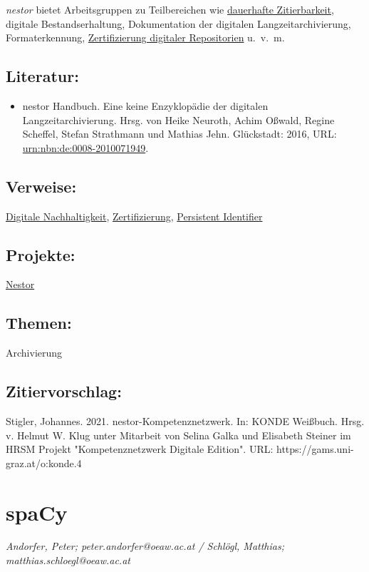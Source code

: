 \documentclass{article}
\begin{document}
        \emph{nestor} bietet Arbeitsgruppen zu Teilbereichen wie \href{http://gams.uni-graz.at/o:konde.12}{dauerhafte Zitierbarkeit}, digitale Bestandserhaltung, Dokumentation der digitalen Langzeitarchivierung, Formaterkennung, \href{http://gams.uni-graz.at/o:konde.13}{Zertifizierung digitaler Repositorien} u. v. m.\\
            
        \subsection*{Literatur:}\begin{itemize}\item nestor Handbuch. Eine keine Enzyklopädie der digitalen Langzeitarchivierung. Hrsg. von Heike Neuroth, Achim Oßwald, Regine Scheffel, Stefan Strathmann und Mathias Jehn. Glückstadt: 2016, URL: \url{urn:nbn:de:0008-2010071949}.\end{itemize}\subsection*{Verweise:}\href{https://gams.uni-graz.at/o:konde.6}{Digitale Nachhaltigkeit}, \href{https://gams.uni-graz.at/o:konde.13}{Zertifizierung}, \href{https://gams.uni-graz.at/o:konde.12}{Persistent Identifier}\subsection*{Projekte:}\href{https://www.langzeitarchivierung.de/Webs/nestor/DE/Home/home_node.htm}{Nestor}\subsection*{Themen:}Archivierung\subsection*{Zitiervorschlag:}Stigler, Johannes. 2021. nestor-Kompetenznetzwerk. In: KONDE Weißbuch. Hrsg. v. Helmut W. Klug unter Mitarbeit von Selina Galka und Elisabeth Steiner im HRSM Projekt "Kompetenznetzwerk Digitale Edition". URL: https://gams.uni-graz.at/o:konde.4\newpage\section*{spaCy} \emph{Andorfer, Peter; peter.andorfer@oeaw.ac.at / Schlögl, Matthias; matthias.schloegl@oeaw.ac.at }\\
        
\end{document}
